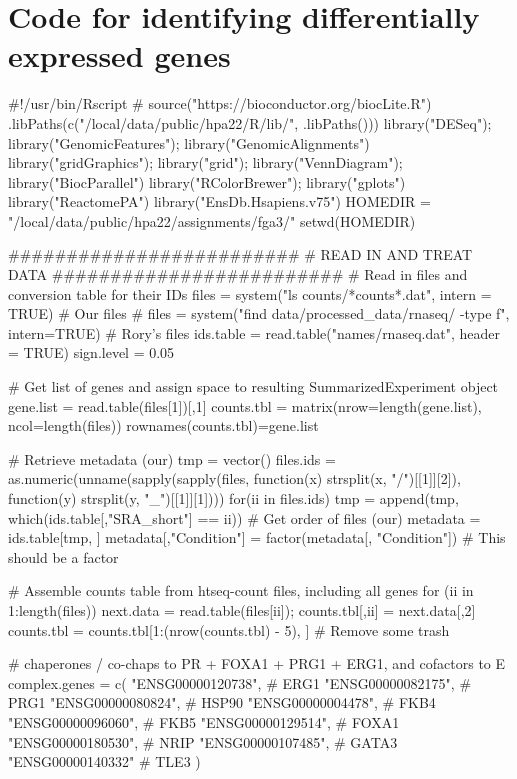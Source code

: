 \documentclass[10pt, twocolumn]{article}\usepackage[]{graphicx}\usepackage[]{color}
\theoremstyle{plain}
\begin{document}
\section*{Code for identifying differentially expressed genes}  
\begin{Schunk}
\begin{Sinput}
#!/usr/bin/Rscript  
# source("https://bioconductor.org/biocLite.R")
.libPaths(c("/local/data/public/hpa22/R/lib/", .libPaths()))
library("DESeq"); library("GenomicFeatures"); library("GenomicAlignments") 
library("gridGraphics"); library("grid"); library("VennDiagram"); library("BiocParallel")
library("RColorBrewer"); library("gplots")
library("ReactomePA")
library("EnsDb.Hsapiens.v75")
HOMEDIR = "/local/data/public/hpa22/assignments/fga3/"
setwd(HOMEDIR)

#########################
# READ IN AND TREAT DATA
#########################
# Read in files and conversion table for their IDs 
files      = system("ls counts/*counts*.dat", intern = TRUE) # Our files
# files = system("find data/processed_data/rnaseq/ -type f", intern=TRUE) # Rory's files
ids.table  = read.table("names/rnaseq.dat", header = TRUE)
sign.level = 0.05

# Get list of genes and assign space to resulting SummarizedExperiment object
gene.list  = read.table(files[1])[,1]
counts.tbl = matrix(nrow=length(gene.list), ncol=length(files))
rownames(counts.tbl)=gene.list

# Retrieve metadata (our)
tmp       = vector()
files.ids = as.numeric(unname(sapply(sapply(files, function(x) strsplit(x, "/")[[1]][2]), function(y) strsplit(y, "_")[[1]][1])))
for(ii in files.ids) {tmp = append(tmp, which(ids.table[,"SRA_short"] == ii))} # Get order of files (our)
metadata  = ids.table[tmp, ]
metadata[,"Condition"] = factor(metadata[, "Condition"]) # This should be a factor

# Assemble counts table from htseq-count files, including all genes 
for (ii in 1:length(files)) {next.data = read.table(files[ii]); counts.tbl[,ii] = next.data[,2]}
counts.tbl = counts.tbl[1:(nrow(counts.tbl) - 5), ] # Remove some trash

# chaperones / co-chaps to PR + FOXA1 + PRG1 + ERG1, and cofactors to E\alpha
complex.genes = c(
  "ENSG00000120738", # ERG1
  "ENSG00000082175", # PRG1 
  "ENSG00000080824", # HSP90
  "ENSG00000004478", # FKB4
  "ENSG00000096060", # FKB5
  "ENSG00000129514", # FOXA1
  "ENSG00000180530", # NRIP
  "ENSG00000107485", # GATA3
  "ENSG00000140332"  # TLE3
)


\end{Sinput}
\end{Schunk}
\end{document}
